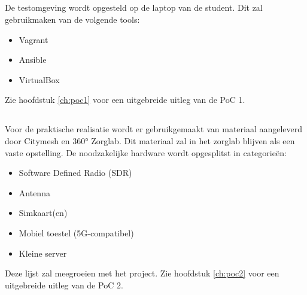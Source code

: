 \subsection{}%
\label{sec:poc1}%
De testomgeving wordt opgesteld op de laptop van de student. Dit zal gebruikmaken van de volgende tools:

\begin{itemize}
    \item Vagrant
    \item Ansible
    \item VirtualBox
\end{itemize}

Zie hoofdstuk \ref{ch:poc1} voor een uitgebreide uitleg van de PoC 1.


\subsection{}%
\label{sec:poc2}%

Voor de praktische realisatie wordt er gebruikgemaakt van materiaal aangeleverd door Citymesh en 360° Zorglab. Dit materiaal zal in het zorglab blijven als een vaste opstelling. De noodzakelijke hardware wordt opgesplitst in categorieën:

\begin{itemize}
    \item Software Defined Radio (SDR)
    \item Antenna
    \item Simkaart(en)
    \item Mobiel toestel (5G-compatibel)
    \item Kleine server
\end{itemize}

Deze lijst zal meegroeien met het project.
Zie hoofdstuk \ref{ch:poc2} voor een uitgebreide uitleg van de PoC 2.

